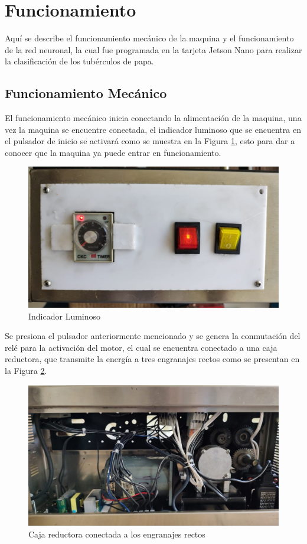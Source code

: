 	\section{Funcionamiento}
	Aquí se describe el funcionamiento mecánico de la maquina y el funcionamiento de la red neuronal, la cual fue programada en la tarjeta Jetson Nano para realizar la clasificación de los tubérculos de papa.
	
	\subsection{Funcionamiento Mecánico}
		El funcionamiento mecánico inicia conectando la alimentación de la maquina, una vez la maquina se encuentre conectada, el indicador luminoso que se encuentra en el pulsador de inicio se activará como se muestra en la Figura \ref{fig:indicador}, esto para dar a conocer que la maquina ya puede entrar en funcionamiento.
		
		\begin{figure}[ht]
			\centering
			\includegraphics[angle=270, scale=0.21]{Figs/200.jpg}
			\caption{Indicador Luminoso}
			\label{fig:indicador}
		\end{figure}
		
		 Se presiona el pulsador anteriormente mencionado y se genera la conmutación del relé para la activación del motor, el cual se encuentra conectado a una caja reductora, que transmite la energía a tres engranajes rectos como se presentan en la Figura \ref{fig:caja}.
		 
		 \newpage		 
		 \begin{figure}[ht]
		 	\centering
		 	\includegraphics[scale=0.13]{Figs/201.jpg}
		 	\caption{Caja reductora conectada a los engranajes rectos}
		 	\label{fig:caja}
		 \end{figure}
		 
